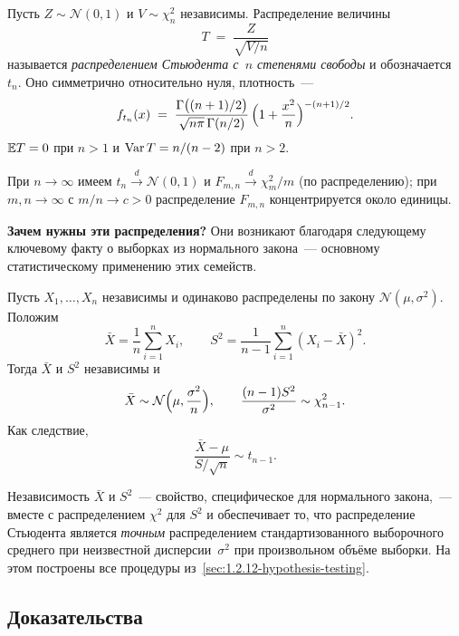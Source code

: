 \begin{definition}
\label{def:t-distribution}
Пусть $Z \sim \mathcal{N}(0, 1)$ и $V \sim \chi^2_n$ независимы. Распределение величины
\[
  T \;=\; \frac{Z}{\sqrt{V / n}}
\]
называется \emph{распределением Стьюдента с~$n$ степенями свободы} и обозначается $t_n$. Оно симметрично относительно нуля, плотность~---
\[
  f_{t_n}(x) \;=\; \frac{\Gamma\bigl((n+1)/2\bigr)}{\sqrt{n \pi}\, \Gamma(n/2)}\, \Bigl(1 + \frac{x^2}{n}\Bigr)^{-(n+1)/2}.
\]
$\mathbb{E} T = 0$ при $n > 1$ и $\operatorname{Var} T = n/(n - 2)$ при $n > 2$.
\end{definition}

\begin{proposition}
\label{prop:asymptotics-chi2-f-t}
При $n \to \infty$ имеем $t_n \xrightarrow{d} \mathcal{N}(0, 1)$ и $F_{m, n} \xrightarrow{d} \chi^2_m / m$ (по распределению); при $m, n \to \infty$ с $m / n \to c > 0$ распределение $F_{m, n}$ концентрируется около единицы.
\end{proposition}

\medskip
\noindent\textbf{Зачем нужны эти распределения?} Они возникают благодаря следующему ключевому факту о выборках из нормального закона~--- основному статистическому применению этих семейств.

\begin{theorem}
\label{thm:sample-mean-variance}
Пусть $X_1, \dots, X_n$ независимы и одинаково распределены по закону $\mathcal{N}(\mu, \sigma^2)$. Положим
\[
  \bar X = \frac{1}{n} \sum_{i=1}^{n} X_i, \qquad
  S^2 = \frac{1}{n - 1} \sum_{i=1}^{n} (X_i - \bar X)^2.
\]
Тогда $\bar X$ и $S^2$ независимы и
\[
  \bar X \sim \mathcal{N}\Bigl(\mu, \frac{\sigma^2}{n}\Bigr), \qquad
  \frac{(n - 1) S^2}{\sigma^2} \sim \chi^2_{n - 1}.
\]
Как следствие,
\[
  \frac{\bar X - \mu}{S / \sqrt n} \sim t_{n - 1}.
\]
\end{theorem}

Независимость $\bar X$ и $S^2$~--- свойство, специфическое для нормального закона,~--- вместе с распределением $\chi^2$ для $S^2$ и обеспечивает то, что распределение Стьюдента является \emph{точным} распределением стандартизованного выборочного среднего при неизвестной дисперсии~$\sigma^2$ при произвольном объёме выборки. На этом построены все процедуры из~\cref{sec:1.2.12-hypothesis-testing}.

\subsection*{Доказательства}

